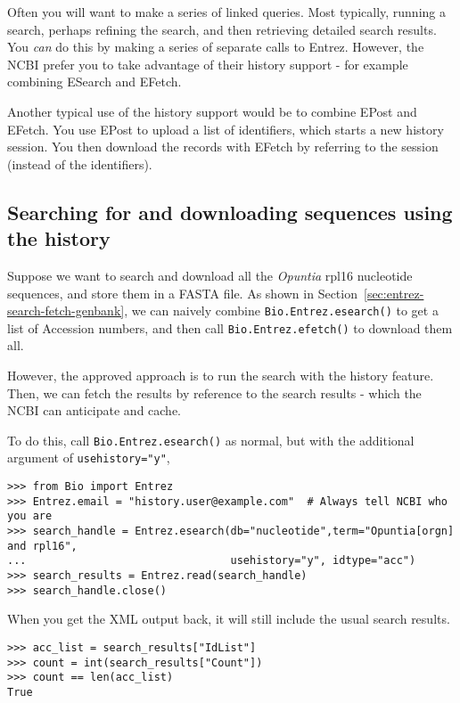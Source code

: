 Often you will want to make a series of linked queries.  Most typically,
running a search, perhaps refining the search, and then retrieving detailed
search results.  You \emph{can} do this by making a series of separate calls
to Entrez.  However, the NCBI prefer you to take advantage of their history
support - for example combining ESearch and EFetch.

Another typical use of the history support would be to combine EPost and
EFetch.  You use EPost to upload a list of identifiers, which starts a new
history session.  You then download the records with EFetch by referring
to the session (instead of the identifiers).

\subsection{Searching for and downloading sequences using the history}
Suppose we want to search and download all the \textit{Opuntia} rpl16
nucleotide sequences, and store them in a FASTA file.  As shown in
Section~\ref{sec:entrez-search-fetch-genbank}, we can naively combine
\verb|Bio.Entrez.esearch()| to get a list of Accession numbers, and then call
\verb|Bio.Entrez.efetch()| to download them all.

However, the approved approach is to run the search with the history
feature.  Then, we can fetch the results by reference to the search
results - which the NCBI can anticipate and cache.

To do this, call \verb|Bio.Entrez.esearch()| as normal, but with the
additional argument of \verb|usehistory="y"|,

\begin{verbatim}
>>> from Bio import Entrez
>>> Entrez.email = "history.user@example.com"  # Always tell NCBI who you are
>>> search_handle = Entrez.esearch(db="nucleotide",term="Opuntia[orgn] and rpl16",
...                                usehistory="y", idtype="acc")
>>> search_results = Entrez.read(search_handle)
>>> search_handle.close()
\end{verbatim}

\noindent When you get the XML output back, it will still include the usual search results.

\begin{verbatim}
>>> acc_list = search_results["IdList"]
>>> count = int(search_results["Count"])
>>> count == len(acc_list)
True
\end{verbatim}

